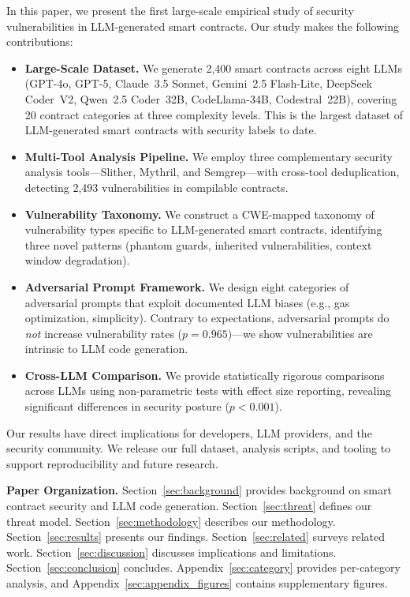 In this paper, we present the first large-scale empirical study of security vulnerabilities in LLM-generated smart contracts. Our study makes the following contributions:

\begin{itemize}[leftmargin=*]
    \item \textbf{Large-Scale Dataset.} We generate 2,400 smart contracts across eight LLMs (GPT-4o, GPT-5, Claude~3.5 Sonnet, Gemini~2.5 Flash-Lite, DeepSeek Coder~V2, Qwen~2.5 Coder~32B, CodeLlama-34B, Codestral~22B), covering 20 contract categories at three complexity levels. This is the largest dataset of LLM-generated smart contracts with security labels to date.
    \item \textbf{Multi-Tool Analysis Pipeline.} We employ three complementary security analysis tools---Slither, Mythril, and Semgrep---with cross-tool deduplication, detecting 2,493 vulnerabilities in compilable contracts.
    \item \textbf{Vulnerability Taxonomy.} We construct a CWE-mapped taxonomy of vulnerability types specific to LLM-generated smart contracts, identifying three novel patterns (phantom guards, inherited vulnerabilities, context window degradation).
    \item \textbf{Adversarial Prompt Framework.} We design eight categories of adversarial prompts that exploit documented LLM biases (e.g., gas optimization, simplicity). Contrary to expectations, adversarial prompts do \emph{not} increase vulnerability rates ($p = 0.965$)---we show vulnerabilities are intrinsic to LLM code generation.
    \item \textbf{Cross-LLM Comparison.} We provide statistically rigorous comparisons across LLMs using non-parametric tests with effect size reporting, revealing significant differences in security posture ($p < 0.001$).
\end{itemize}

Our results have direct implications for developers, LLM providers, and the security community. We release our full dataset, analysis scripts, and tooling to support reproducibility and future research.

\textbf{Paper Organization.} Section~\ref{sec:background} provides background on smart contract security and LLM code generation. Section~\ref{sec:threat} defines our threat model. Section~\ref{sec:methodology} describes our methodology. Section~\ref{sec:results} presents our findings. Section~\ref{sec:related} surveys related work. Section~\ref{sec:discussion} discusses implications and limitations. Section~\ref{sec:conclusion} concludes. Appendix~\ref{sec:category} provides per-category analysis, and Appendix~\ref{sec:appendix_figures} contains supplementary figures.
